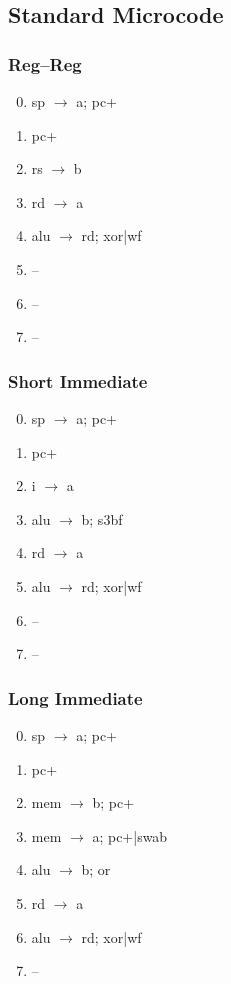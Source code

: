 \documentclass[11pt]{book}
\begin{document}
\subsection*{Standard Microcode}
\begin{multicols}{3}\ttfamily\selectfont\small
  \subsubsection*{Reg--Reg}
  \begin{enumerate}\setcounter{enumi}{-1}
  \item sp \(\rightarrow\) a; pc+
  \item pc+
  \item rs \(\rightarrow\) b
  \item rd \(\rightarrow\) a
  \item alu \(\rightarrow\) rd; xor|wf
  \item --
  \item --
  \item --
  \end{enumerate}
  \columnbreak
  \subsubsection*{Short Immediate}
  \begin{enumerate}\setcounter{enumi}{-1}
  \item sp \(\rightarrow\) a; pc+
  \item pc+
  \item i \(\rightarrow\) a
  \item alu \(\rightarrow\) b; s3bf
  \item rd \(\rightarrow\) a
  \item alu \(\rightarrow\) rd; xor|wf
  \item --
  \item --
  \end{enumerate}
  \columnbreak
  \subsubsection*{Long Immediate}
  \begin{enumerate}\setcounter{enumi}{-1}
  \item sp \(\rightarrow\) a; pc+
  \item pc+
  \item mem \(\rightarrow\) b; pc+
  \item mem \(\rightarrow\) a; pc+|swab
  \item alu \(\rightarrow\) b; or
  \item rd \(\rightarrow\) a
  \item alu \(\rightarrow\) rd; xor|wf
  \item --
  \end{enumerate}
\end{multicols}
\end{document}
